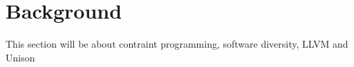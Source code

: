 \chapter{Background}

This section will be about contraint programming, software diversity, LLVM and Unison









